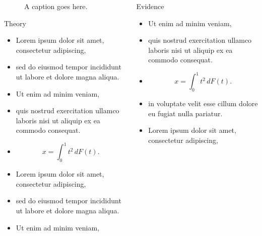 \documentclass[12pt, final]{beamer}
\newlength{\onecolwid}
\newlength{\twocolwid}
\begin{document}
\begin{frame}[t]
\begin{columns}[t]
\begin{column}{\twocolwid}
      \begin{columns}[t]
        \begin{column}{\onecolwid}
          \begin{figure}
            \label{fig:pic}
            \caption{A caption goes here.}
          \end{figure}
          \begin{block}{Theory}
            \begin{itemize}
              \item Lorem ipsum \alert{dolor} sit amet, consectetur adipiscing,
              \item sed do eiusmod tempor incididunt ut labore et dolore magna aliqua.
              \item Ut enim ad minim veniam,
              \item quis nostrud exercitation ullamco laboris nisi ut aliquip ex ea commodo consequat.
              \item $$x = \int_0^1 t^2 \,dF(t).$$
              \item Lorem ipsum \alert{dolor} sit amet, consectetur adipiscing,
              \item sed do eiusmod tempor incididunt ut labore et dolore magna aliqua.
              \item Ut enim ad minim veniam,
            \end{itemize}
          \end{block}
        \end{column}
        \begin{column}{\onecolwid}
          \begin{block}{Evidence}
            \begin{itemize}
              \item Ut enim ad minim veniam,
              \item quis nostrud exercitation ullamco laboris nisi ut aliquip ex ea commodo consequat.
              \item $$x = \int_0^1 t^2 \,dF(t).$$
              \item in voluptate velit \alert{esse cillum dolore} eu fugiat nulla pariatur.
              \item Lorem ipsum \alert{dolor} sit amet, consectetur adipiscing,

\end{itemize}
\end{block}
\end{column}
\end{columns}
\end{column}
\end{columns}
\end{frame}
\end{document}
